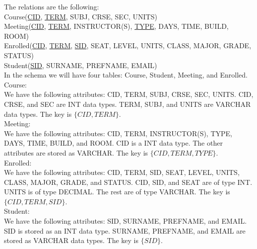 
The relations are the following: \\

Course(\underline{CID}, \underline{TERM}, SUBJ, CRSE, SEC, UNITS) \\
Meeting(\underline{CID}, \underline{TERM}, INSTRUCTOR(S), \underline{TYPE}, DAYS, TIME, BUILD, ROOM) \\
Enrolled(\underline{CID}, \underline{TERM}, \underline{SID}, SEAT, LEVEL, UNITS, CLASS, MAJOR, GRADE, STATUS) \\
Student(\underline{SID}, SURNAME, PREFNAME, EMAIL) \\

In the schema we will have four tables: Course, Student, Meeting, and Enrolled. \\

Course: \\
We have the following attributes: CID, TERM, SUBJ, CRSE, SEC, UNITS. CID, CRSE, and SEC are INT data types. TERM, SUBJ, and UNITS are VARCHAR data types. The key is $\{CID, TERM\}$. \\

Meeting:\\
We have the following attributes: CID, TERM, INSTRUCTOR(S), TYPE, DAYS, TIME, BUILD, and ROOM. CID is a INT data type. The other attributes are stored as VARCHAR. The key is $\{CID, TERM, TYPE\}$. \\

Enrolled: \\
We have the following attributes: CID, TERM, SID, SEAT, LEVEL, UNITS, CLASS, MAJOR, GRADE, and STATUS. CID, SID, and SEAT are of type INT. UNITS is of type DECIMAL. The rest are of type VARCHAR. The key is $\{CID, TERM, SID\}$. \\

Student: \\
We have the following attributes: SID, SURNAME, PREFNAME, and EMAIL. SID is stored as an INT data type. SURNAME, PREFNAME, and EMAIL are stored as VARCHAR data types. The key is $\{SID\}$. \\